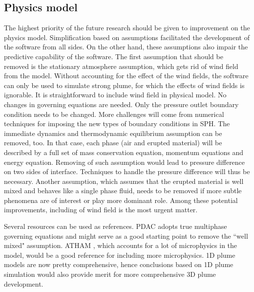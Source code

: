\subsection{Physics model}
The highest priority of the future research should be given to improvement on the physics model. Simplification based on assumptions facilitated the development of the software from all sides. On the other hand, these assumptions also impair the predictive capability of the software. The first assumption that should be removed is the stationary atmosphere assumption, which gets rid of wind field from the model. Without accounting for the effect of the wind fields, the software can only be used to simulate strong plume, for which the effects of wind fields is ignorable. It is straightforward to include wind field in physical model. No changes in governing equations are needed. Only the pressure outlet boundary condition needs to be changed. More challenges will come from numerical techniques for imposing the new types of boundary conditions in SPH. 
The immediate dynamics and thermodynamic equilibrium assumption can be removed, too. In that case, each phase (air and erupted material) will be described by a full set of mass conservation equation, momentum equations and energy equation. Removing of such assumption would lead to pressure difference on two sides of interface. Techniques to handle the pressure difference will thus be necessary. Another assumption, which assumes that the erupted material is well mixed and behaves like a single phase fluid, needs to be removed if more subtle phenomena are of interest or play more dominant role. Among these potential improvements, including of wind field is the most urgent matter.

Several resources can be used  as references. PDAC\citep{neri2003multiparticle} adopts true multiphase governing equations and might serve as a good starting point to remove the ``well mixed" assumption. ATHAM  \citep{oberhuber1998volcanic}, which accounts for a lot of microphysics in the model, would be a good reference for including more microphysics. 1D plume models \citep{bursik2001effect, pouget2016sensitivity, folch2016fplume} are now pretty comprehensive, hence conclusions based on 1D plume simulation would also provide merit for more comprehensive 3D plume development.

